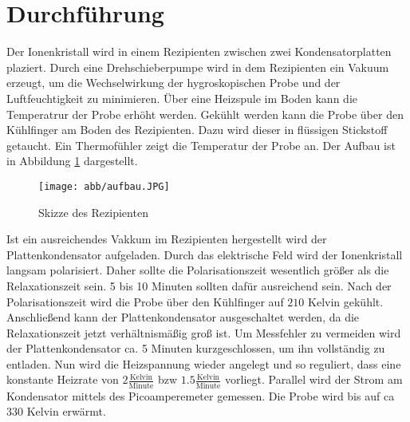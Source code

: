 \section{Durchführung}
\label{sec:Durchführung}

Der Ionenkristall wird in einem Rezipienten zwischen zwei Kondensatorplatten plaziert.
Durch eine Drehschieberpumpe wird in dem Rezipienten ein Vakuum erzeugt,
um die Wechselwirkung der hygroskopischen Probe und der Luftfeuchtigkeit zu minimieren.
Über eine Heizspule im Boden kann die Temperatrur der Probe erhöht werden.
Gekühlt werden kann die Probe über den Kühlfinger am Boden des Rezipienten.
Dazu wird dieser in flüssigen Stickstoff getaucht.
Ein Thermofühler zeigt die Temperatur der Probe an.
Der Aufbau ist in Abbildung \ref{abb:aufbau} dargestellt.
\begin{figure}[h] 
    \centering
    \texttt{[image: abb/aufbau.JPG]}
    \caption{Skizze des Rezipienten \cite{sample}}
    \label{abb:aufbau}
\end{figure}
Ist ein ausreichendes Vakkum im Rezipienten hergestellt wird der Plattenkondensator aufgeladen.
Durch das elektrische Feld wird der Ionenkristall langsam polarisiert.
Daher sollte die Polarisationszeit wesentlich größer als die Relaxationszeit sein.
5 bis 10 Minuten sollten dafür ausreichend sein.
Nach der Polarisationszeit wird die Probe über den Kühlfinger auf $210$ Kelvin gekühlt.
Anschließend kann der Plattenkondensator ausgeschaltet werden,
da die Relaxationszeit jetzt verhältnismäßig groß ist.
Um Messfehler zu vermeiden wird der Plattenkondensator ca. 5 Minuten kurzgeschlossen, 
um ihn vollständig zu entladen.
Nun wird die Heizspannung wieder angelegt und so reguliert,
dass eine konstante Heizrate von $2 \frac{\text{Kelvin}}{\text{Minute}}$ bzw $1.5 \frac{\text{Kelvin}}{\text{Minute}}$ vorliegt.
Parallel wird der Strom am Kondensator mittels des Picoamperemeter gemessen.
Die Probe wird bis auf ca $330$ Kelvin erwärmt.
